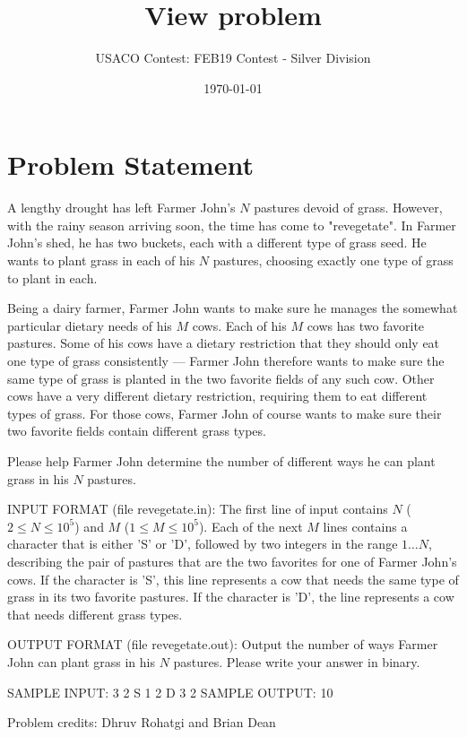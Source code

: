 \documentclass[12pt]{article}
\title{View problem}
\author{USACO Contest: FEB19 Contest - Silver Division}
\date{\today}
\begin{document}
\maketitle

\section*{Problem Statement}

A lengthy drought has left Farmer John's $N$ pastures devoid of grass.  However,
with the rainy season arriving soon, the time has come to "revegetate".
In Farmer John's shed, he has two buckets, each with a different type of grass 
seed.  He wants to plant grass in each of his $N$ pastures, choosing exactly
one type of grass to plant in each.

Being a dairy farmer, Farmer John wants to make sure he manages the somewhat
particular dietary needs of his $M$ cows.  Each of his $M$ cows has two favorite 
pastures.  Some of his cows have a dietary restriction that they should only eat
one type of grass consistently --- Farmer John therefore wants to make sure the
same type of grass is planted in the two favorite fields of any such cow.  Other
cows have a very different dietary restriction, requiring them to eat different
types of grass.  For those cows, Farmer John of course wants to make sure their 
two favorite fields contain different grass types.

Please help Farmer John determine the number of different ways he can plant 
grass in his $N$ pastures.

INPUT FORMAT (file revegetate.in):
The first line of input contains $N$ ($2 \leq N \leq 10^5$) and $M$
($1 \leq M \leq 10^5$). Each of the next $M$ lines contains a character
that is either 'S' or 'D', followed by two integers in the
range $1 \ldots N$, describing the pair of pastures that are the two favorites
for one of Farmer John's cows.  If the character is 'S', this line represents
a cow that needs the same type of grass in its two favorite pastures.  If
the character is 'D', the line represents a cow that needs different grass
types.

OUTPUT FORMAT (file revegetate.out):
Output the number of ways Farmer John can plant grass in his $N$ pastures.
Please write your answer in binary.

SAMPLE INPUT:
3 2
S 1 2
D 3 2
SAMPLE OUTPUT: 
10


Problem credits: Dhruv Rohatgi and Brian Dean
\end{document}
